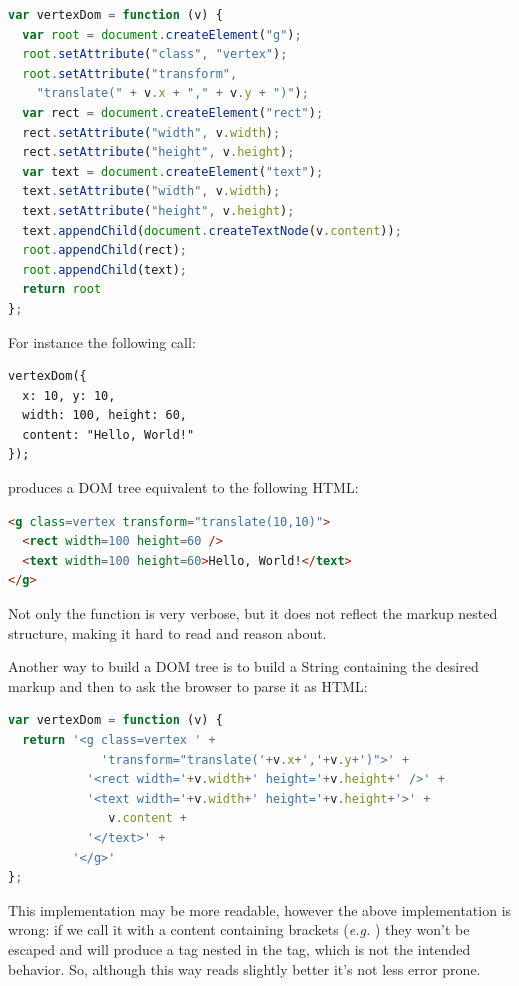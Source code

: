 \documentclass[american,english,runningheads]{llncs}
\newcommand{\eg}{\emph{e.g.}}
\begin{document}
\begin{lstlisting}[language=JavaScript,label=dom-api,caption=DOM fragment creation using the native API]
var vertexDom = function (v) {
  var root = document.createElement("g");
  root.setAttribute("class", "vertex");
  root.setAttribute("transform",
    "translate(" + v.x + "," + v.y + ")");
  var rect = document.createElement("rect");
  rect.setAttribute("width", v.width);
  rect.setAttribute("height", v.height);
  var text = document.createElement("text");
  text.setAttribute("width", v.width);
  text.setAttribute("height", v.height);
  text.appendChild(document.createTextNode(v.content));
  root.appendChild(rect);
  root.appendChild(text);
  return root
};
\end{lstlisting}

For instance the following call:
\begin{lstlisting}
vertexDom({
  x: 10, y: 10,
  width: 100, height: 60,
  content: "Hello, World!"
});
\end{lstlisting}
produces a DOM tree equivalent to the following HTML:
\begin{lstlisting}[language=HTML]
<g class=vertex transform="translate(10,10)">
  <rect width=100 height=60 />
  <text width=100 height=60>Hello, World!</text>
</g>
\end{lstlisting}

Not only the  function is very verbose, but it does not reflect the markup nested structure, making it hard to read and reason about.

Another way to build a DOM tree is to build a String containing the desired markup and then to ask the browser to parse it as HTML:

\begin{lstlisting}[language=JavaScript]
var vertexDom = function (v) {
  return '<g class=vertex ' +
             'transform="translate('+v.x+','+v.y+')">' +
           '<rect width='+v.width+' height='+v.height+' />' +
           '<text width='+v.width+' height='+v.height+'>' +
              v.content +
           '</text>' +
         '</g>'
};
\end{lstlisting}

This implementation may be more readable, however the above implementation is wrong: if we call it with a content containing brackets (\eg{} ) they won’t be escaped and will produce a  tag nested in the  tag, which is not the intended behavior. So, although this way reads slightly better it’s not less error prone.
\end{document}
